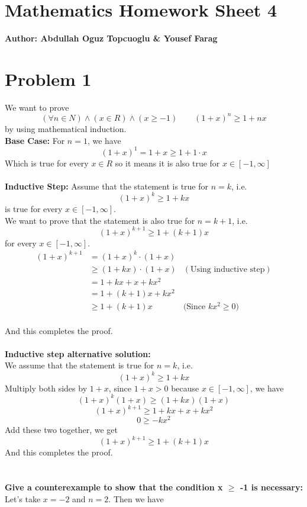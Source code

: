 \documentclass{article}
\begin{document}
\section*{\huge Mathematics Homework Sheet 4}
\begin{flushright}
   \textbf{Author: Abdullah Oguz Topcuoglu \& Yousef Farag}
\end{flushright}

\section*{Problem 1}
We want to prove
\[
   (\forall n \in N) \land (x \in R) \land (x \geq -1) \qquad (1 + x)^n \geq 1 + nx
\]
by using mathematical induction.\\
\textbf{Base Case:} For $n = 1$, we have
\[
   (1 + x)^1 = 1 + x \geq 1 + 1 \cdot x
\]
Which is true for every \(x \in R\) so it means it is also true for \(x \in [-1, \infty]\)\\
\\
\textbf{Inductive Step:} Assume that the statement is true for \(n = k\), i.e.
\[
   (1 + x)^k \geq 1 + kx
\]
is true for every \(x \in [-1, \infty]\).\\
We want to prove that the statement is also true for \(n = k + 1\), i.e.
\[
   (1 + x)^{k + 1} \geq 1 + (k + 1)x
\]
for every \(x \in [-1, \infty]\).\\

\begin{align}
   (1 + x)^{k + 1} & = (1 + x)^k \cdot (1 + x)                                                                                  \\
                   & \geq (1 + kx) \cdot (1 + x) & (\text{Using inductive step}) \label{eg:step2}                                                 \\
                   & = 1 + kx + x + kx^2                                                                                        \\
                   & = 1 + (k + 1)x + kx^2                                                                                      \\
                   & \geq 1 + (k + 1)x            &\text{(Since \(kx^2 \geq 0\))}
\end{align}
\\
And this completes the proof.
\\
\\
\textbf{Inductive step alternative solution:} \\
We assume that the statement is true for \(n = k\), i.e.
\[
   (1 + x)^k \geq 1 + kx
\]
Multiply both sides by \(1 + x\), since \(1 + x > 0\) because \(x \in [-1, \infty]\), we have
\[
   (1 + x)^{k} (1 + x) \geq (1 + kx)(1 + x)
\]
\[
   (1 + x)^{k + 1} \geq 1 + kx + x + kx^2
\]
\[
   0 \geq -kx^2
\]
Add these two together, we get
\[
   (1 + x)^{k + 1} \geq 1 + (k + 1)x
\]
And this completes the proof.\\
\\
\\
\textbf{Give a counterexample to show that the condition x \(\geq\) -1 is necessary:}\\
Let's take \(x = -2\) and \(n = 2\). Then we have
\end{document}
